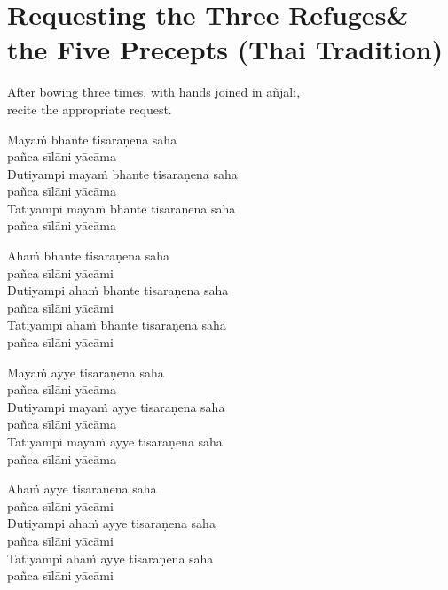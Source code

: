 \section[Three Refuges \& the Five Precepts]{Requesting the Three Refuges\newline \& the Five Precepts (Thai Tradition)}

\label{three-refuges}

\begin{instruction}
  After bowing three times, with hands joined in añjali,\\
  recite the appropriate request.
\end{instruction}

\ifhandbookedition
\enlargethispage{\baselineskip}
\fi


Mayaṁ bhante tisaraṇena saha\\\vin pañca sīlāni yācāma\\
Dutiyampi mayaṁ bhante tisaraṇena saha\\\vin pañca sīlāni yācāma\\
Tatiyampi mayaṁ bhante tisaraṇena saha\\\vin pañca sīlāni yācāma


Ahaṁ bhante tisaraṇena saha\\\vin pañca sīlāni yācāmi\\
Dutiyampi ahaṁ bhante tisaraṇena saha\\\vin pañca sīlāni yācāmi\\
Tatiyampi ahaṁ bhante tisaraṇena saha\\\vin pañca sīlāni yācāmi


Mayaṁ ayye tisaraṇena saha\\\vin pañca sīlāni yācāma\\
Dutiyampi mayaṁ ayye tisaraṇena saha\\\vin pañca sīlāni yācāma\\
Tatiyampi mayaṁ ayye tisaraṇena saha\\\vin pañca sīlāni yācāma


Ahaṁ ayye tisaraṇena saha\\\vin pañca sīlāni yācāmi\\
Dutiyampi ahaṁ ayye tisaraṇena saha\\\vin pañca sīlāni yācāmi\\
Tatiyampi ahaṁ ayye tisaraṇena saha\\\vin pañca sīlāni yācāmi

